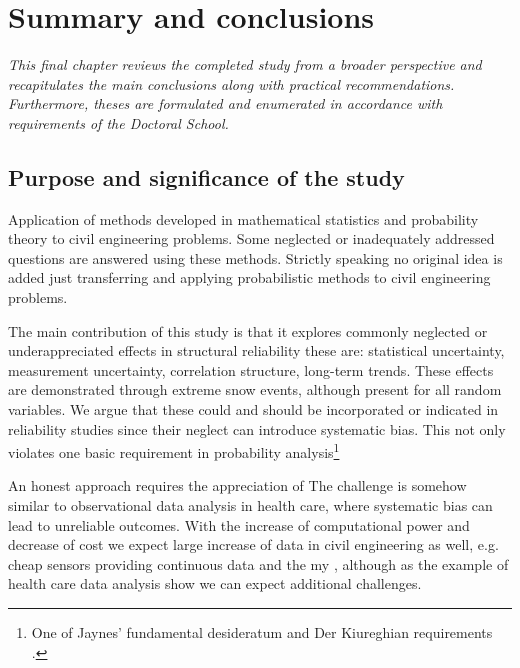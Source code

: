 \chapter{Summary and conclusions}
\label{cha:summary}
\ifpdf
    \graphicspath{{Chapter9/Figs/Raster/}{Chapter9/Figs/PDF/}{Chapter9/Figs/}}
\else
    \graphicspath{{Chapter9/Figs/Vector/}{Chapter9/Figs/}}
\fi

\leftskip=1cm
\noindent
\emph{This final chapter reviews the completed study from a broader perspective and recapitulates the main conclusions along with practical recommendations. Furthermore, theses are formulated and enumerated in accordance with requirements of the Doctoral School.}

\leftskip=0pt\rightskip=0pt

\section{Purpose and significance of the study}

Application of methods developed in mathematical statistics and probability theory to civil engineering problems. Some neglected or inadequately addressed questions are answered using these methods. Strictly speaking no original idea is added just transferring and applying probabilistic methods to civil engineering problems.

The main contribution of this study is that it explores commonly neglected or underappreciated effects in structural reliability these are: statistical uncertainty, measurement uncertainty, correlation structure, long-term trends. These effects are demonstrated through extreme snow events, although present for all random variables. We argue that these could and should be incorporated or indicated in reliability studies since their neglect can introduce systematic bias. This not only violates one basic requirement in probability analysis\footnote{One of Jaynes' fundamental desideratum \citep{Jaynes2003} and Der Kiureghian requirements \citep{Kiureghian1989}.}

An honest approach requires the appreciation of 
The challenge is somehow similar to observational data analysis in health care, where systematic bias can lead to unreliable outcomes. With the increase of computational power and decrease of cost we expect large increase of data in civil engineering as well, e.g. cheap sensors providing continuous data and the my , although as the example of health care data analysis show we can expect additional challenges.

